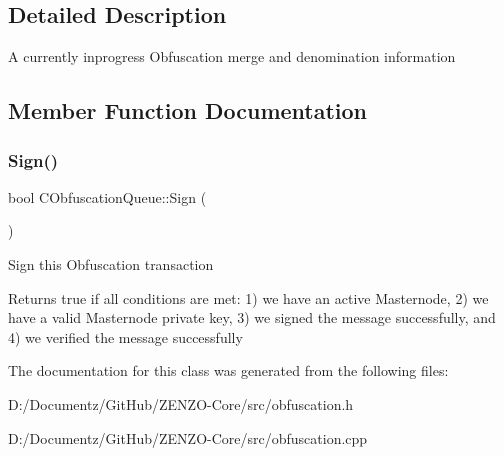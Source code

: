 \subsection{Detailed Description}
A currently inprogress Obfuscation merge and denomination information 

\subsection{Member Function Documentation}
\mbox{\label{class_c_obfuscation_queue_a7d7be50e6c9ca531f4a4b69a3f7c0b79}} 
\subsubsection{\texorpdfstring{Sign()}{Sign()}}
{\footnotesize\ttfamily bool C\+Obfuscation\+Queue\+::\+Sign (\begin{DoxyParamCaption}{ }\end{DoxyParamCaption})}

Sign this Obfuscation transaction \begin{DoxyReturn}{Returns}
true if all conditions are met\+: 1) we have an active Masternode, 2) we have a valid Masternode private key, 3) we signed the message successfully, and 4) we verified the message successfully 
\end{DoxyReturn}


The documentation for this class was generated from the following files\+:\begin{DoxyCompactItemize}
\item 
D\+:/\+Documentz/\+Git\+Hub/\+Z\+E\+N\+Z\+O-\/\+Core/src/obfuscation.\+h\item 
D\+:/\+Documentz/\+Git\+Hub/\+Z\+E\+N\+Z\+O-\/\+Core/src/obfuscation.\+cpp\end{DoxyCompactItemize}
